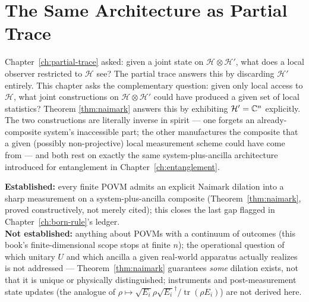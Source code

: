 \section{The Same Architecture as Partial Trace}

\begin{remark}
Chapter~\ref{ch:partial-trace} asked: given a joint state on
$\mathcal H\otimes\mathcal H'$, what does a local observer restricted to
$\mathcal H$ see? The partial trace answers this by discarding $\mathcal H'$
entirely. This chapter asks the complementary question: given only local
access to $\mathcal H$, what joint constructions on $\mathcal H\otimes
\mathcal H'$ could have produced a given set of local statistics? Theorem
\ref{thm:naimark} answers this by exhibiting $\mathcal H'=\mathbb{C}^n$ explicitly.
The two constructions are literally inverse in spirit — one forgets an
already-composite system's inaccessible part; the other manufactures the
composite that a given (possibly non-projective) local measurement scheme
could have come from — and both rest on exactly the same system-plus-ancilla
architecture introduced for entanglement in Chapter~\ref{ch:entanglement}.
\end{remark}

\begin{ledgerentry}
\textbf{Established:} every finite POVM admits an explicit Naimark dilation
into a sharp measurement on a system-plus-ancilla composite
(Theorem~\ref{thm:naimark}, proved constructively, not merely cited); this
closes the last gap flagged in Chapter~\ref{ch:born-rule}'s ledger.\\
\textbf{Not established:} anything about POVMs with a continuum of outcomes
(this book's finite-dimensional scope stops at finite $n$); the operational
question of which unitary $U$ and which ancilla a given real-world apparatus
actually realizes is not addressed — Theorem~\ref{thm:naimark} guarantees
\emph{some} dilation exists, not that it is unique or physically
distinguished; instruments and post-measurement state updates (the analogue
of $\rho \mapsto \sqrt{E_i}\rho\sqrt{E_i}^\dagger/\operatorname{tr}(\rho E_i)$)
are not derived here.
\end{ledgerentry}
